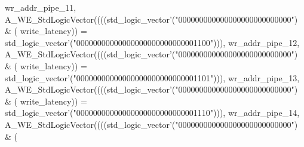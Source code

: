 \begin{DoxyCode}
{      wr_addr_pipe_11}\textcolor{vhdlchar}{,} \textcolor{vhdlchar}{A\_WE\_StdLogicVector}\textcolor{vhdlchar}{(}\textcolor{vhdlchar}{(}\textcolor{vhdlchar}{(}\textcolor{vhdlchar}{(}\textcolor{comment}{std\_logic\_vector}\textcolor{vhdlchar}{'}\textcolor{vhdlchar}{(}\textcolor{vhdllogic}{"000000000000000000000000000"}\textcolor{vhdlchar}{)} \textcolor{vhdlchar}{&} \textcolor{vhdlchar}{(}\textcolor{vhdlchar}{
      write_latency}\textcolor{vhdlchar}{)}\textcolor{vhdlchar}{)} \textcolor{vhdlchar}{=} \textcolor{comment}{std\_logic\_vector}\textcolor{vhdlchar}{'}\textcolor{vhdlchar}{(}\textcolor{vhdllogic}{"00000000000000000000000000001100"}\textcolor{vhdlchar}{)}\textcolor{vhdlchar}{)}\textcolor{vhdlchar}{)}\textcolor{vhdlchar}{,} \textcolor{vhdlchar}{
      wr_addr_pipe_12}\textcolor{vhdlchar}{,} \textcolor{vhdlchar}{A\_WE\_StdLogicVector}\textcolor{vhdlchar}{(}\textcolor{vhdlchar}{(}\textcolor{vhdlchar}{(}\textcolor{vhdlchar}{(}\textcolor{comment}{std\_logic\_vector}\textcolor{vhdlchar}{'}\textcolor{vhdlchar}{(}\textcolor{vhdllogic}{"000000000000000000000000000"}\textcolor{vhdlchar}{)} \textcolor{vhdlchar}{&} \textcolor{vhdlchar}{(}\textcolor{vhdlchar}{
      write_latency}\textcolor{vhdlchar}{)}\textcolor{vhdlchar}{)} \textcolor{vhdlchar}{=} \textcolor{comment}{std\_logic\_vector}\textcolor{vhdlchar}{'}\textcolor{vhdlchar}{(}\textcolor{vhdllogic}{"00000000000000000000000000001101"}\textcolor{vhdlchar}{)}\textcolor{vhdlchar}{)}\textcolor{vhdlchar}{)}\textcolor{vhdlchar}{,} \textcolor{vhdlchar}{
      wr_addr_pipe_13}\textcolor{vhdlchar}{,} \textcolor{vhdlchar}{A\_WE\_StdLogicVector}\textcolor{vhdlchar}{(}\textcolor{vhdlchar}{(}\textcolor{vhdlchar}{(}\textcolor{vhdlchar}{(}\textcolor{comment}{std\_logic\_vector}\textcolor{vhdlchar}{'}\textcolor{vhdlchar}{(}\textcolor{vhdllogic}{"000000000000000000000000000"}\textcolor{vhdlchar}{)} \textcolor{vhdlchar}{&} \textcolor{vhdlchar}{(}\textcolor{vhdlchar}{
      write_latency}\textcolor{vhdlchar}{)}\textcolor{vhdlchar}{)} \textcolor{vhdlchar}{=} \textcolor{comment}{std\_logic\_vector}\textcolor{vhdlchar}{'}\textcolor{vhdlchar}{(}\textcolor{vhdllogic}{"00000000000000000000000000001110"}\textcolor{vhdlchar}{)}\textcolor{vhdlchar}{)}\textcolor{vhdlchar}{)}\textcolor{vhdlchar}{,} \textcolor{vhdlchar}{
      wr_addr_pipe_14}\textcolor{vhdlchar}{,} \textcolor{vhdlchar}{A\_WE\_StdLogicVector}\textcolor{vhdlchar}{(}\textcolor{vhdlchar}{(}\textcolor{vhdlchar}{(}\textcolor{vhdlchar}{(}\textcolor{comment}{std\_logic\_vector}\textcolor{vhdlchar}{'}\textcolor{vhdlchar}{(}\textcolor{vhdllogic}{"000000000000000000000000000"}\textcolor{vhdlchar}{)} \textcolor{vhdlchar}{&} \textcolor{vhdlchar}{(}\textcolor{vhdlchar}{
}
\end{DoxyCode}
